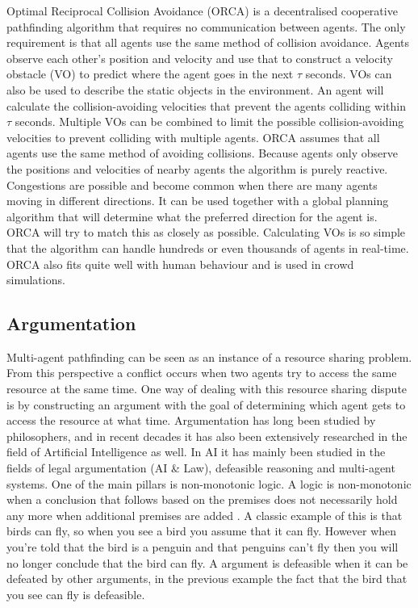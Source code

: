 Optimal Reciprocal Collision Avoidance (ORCA) \cite{vandenberg2011} is a
decentralised cooperative pathfinding algorithm that requires no communication
between agents. The only requirement is that all agents use the same method of
collision avoidance. Agents observe each other's position and velocity and use
that to construct a velocity obstacle (VO) to predict where the agent goes in
the next $\tau$ seconds. VOs can also be used to describe the static objects in
the environment. An agent will calculate the collision-avoiding velocities that
prevent the agents colliding within $\tau$ seconds. Multiple VOs can be
combined to limit the possible collision-avoiding velocities to prevent
colliding with multiple agents. ORCA assumes that all agents use the same
method of avoiding collisions. Because agents only observe the positions and
velocities of nearby agents the algorithm is purely reactive. Congestions are
possible and become common when there are many agents moving in different
directions. It can be used together with a global planning algorithm that will
determine what the preferred direction for the agent is. ORCA will try to
match this as closely as possible. Calculating VOs is so simple that the
algorithm can handle hundreds or even thousands of agents in real-time. ORCA
also fits quite well with human behaviour and is used in crowd simulations.

\subsection{Argumentation}
Multi-agent pathfinding can be seen as an instance of a resource sharing
problem. From this perspective a conflict occurs when two agents try to access
the same resource at the same time. One way of dealing with this resource
sharing dispute is by constructing an argument with the goal of determining
which agent gets to access the resource at what time. Argumentation has long
been studied by philosophers, and in recent decades it has also been
extensively researched in
the field of Artificial Intelligence as well. In AI it has mainly been studied
in the fields of legal argumentation (AI \& Law), defeasible reasoning and
multi-agent systems. One of the main pillars is non-monotonic logic. A logic is
non-monotonic when a conclusion that follows based on the premises does not
necessarily hold any more when additional premises are added
\cite{vaneemeren2014,modgil2013}. A classic example of this is that birds can
fly, so when
you see a bird you assume that it can fly. However when you're told that the
bird is a penguin and that penguins can't fly then you will no longer conclude
that the bird can fly. A argument is defeasible when it can be defeated by
other arguments, in the previous example the fact that the bird that you see
can fly is defeasible.

